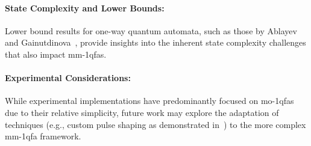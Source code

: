\paragraph{State Complexity and Lower Bounds:} Lower bound results for one-way quantum automata, such as those by Ablayev and Gainutdinova~\cite{10.1007/3-540-44612-5_9}, provide insights into the inherent state complexity challenges that also impact \gls{mm-1qfa}s.

\paragraph{Experimental Considerations:} While experimental implementations have predominantly focused on \gls{mo-1qfa}s due to their relative simplicity, future work may explore the adaptation of techniques (e.g., custom pulse shaping as demonstrated in~\cite{lussi2024implementingquantumfiniteautomaton}) to the more complex \gls{mm-1qfa} framework.

